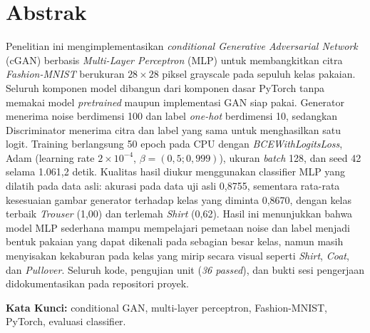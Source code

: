 \chapter*{Abstrak}

Penelitian ini mengimplementasikan \textit{conditional Generative Adversarial Network} (cGAN) berbasis \textit{Multi-Layer Perceptron} (MLP) untuk membangkitkan citra \textit{Fashion-MNIST} berukuran $28\times28$ piksel grayscale pada sepuluh kelas pakaian. Seluruh komponen model dibangun dari komponen dasar PyTorch tanpa memakai model \textit{pretrained} maupun implementasi GAN siap pakai. Generator menerima noise berdimensi 100 dan label \textit{one-hot} berdimensi 10, sedangkan Discriminator menerima citra dan label yang sama untuk menghasilkan satu logit. Training berlangsung 50 epoch pada CPU dengan \textit{BCEWithLogitsLoss}, Adam (learning rate $2\times10^{-4}$, $\beta=(0{,}5;0{,}999)$), ukuran \textit{batch} 128, dan seed 42 selama 1.061,2 detik. Kualitas hasil diukur menggunakan classifier MLP yang dilatih pada data asli: akurasi pada data uji asli 0,8755, sementara rata-rata kesesuaian gambar generator terhadap kelas yang diminta 0,8670, dengan kelas terbaik \textit{Trouser} (1,00) dan terlemah \textit{Shirt} (0,62). Hasil ini menunjukkan bahwa model MLP sederhana mampu mempelajari pemetaan noise dan label menjadi bentuk pakaian yang dapat dikenali pada sebagian besar kelas, namun masih menyisakan kekaburan pada kelas yang mirip secara visual seperti \textit{Shirt}, \textit{Coat}, dan \textit{Pullover}. Seluruh kode, pengujian unit (\textit{36 passed}), dan bukti sesi pengerjaan didokumentasikan pada repositori proyek.

\vspace{0.5 cm}
\begin{flushleft}
{\textbf{Kata Kunci:} conditional GAN, multi-layer perceptron, Fashion-MNIST, PyTorch, evaluasi classifier.}
\end{flushleft}
